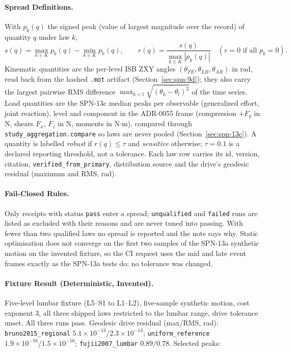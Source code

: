 \paragraph{Spread Definitions.}
With $p_k(q)$ the signed peak (value of largest magnitude over the record) of
quantity $q$ under law $k$,
\begin{equation}
  s(q)=\max_{k\in K}p_k(q)-\min_{k\in K}p_k(q),\qquad
  r(q)=\frac{s(q)}{\max_{k\in K}|p_k(q)|}\quad(r=0\text{ if all }p_k=0).
\end{equation}
Kinematic quantities are the per-level ISB ZXY angles
$(\theta_{FE},\theta_{LB},\theta_{AR})$ in rad, read back from the hashed
\texttt{.mot} artifact (Section~\ref{sec:spn-9d}); they also carry the largest
pairwise RMS difference $\max_{k<l}\sqrt{\overline{(\theta_k-\theta_l)^2}}$ of
the time series. Load quantities are the SPN-13c median peaks per observable
(generalized effort, joint reaction), level and component in the ADR-0055
frame (compression $+F_y$ in N, shears $F_x$, $F_z$ in N, moments in
N$\cdot$m), compared through \texttt{study\_aggregation.compare} so laws are
never pooled (Section~\ref{sec:spn-13c}). A quantity is labelled
\emph{robust} if $r(q)\le\tau$ and \emph{sensitive} otherwise; $\tau=0.1$ is a
declared reporting threshold, not a tolerance. Each law row carries its id,
version, citation, \texttt{verified\_from\_primary}, distribution source and
the drive's geodesic residual (maximum and RMS, rad).

\paragraph{Fail-Closed Rules.}
Only receipts with status \texttt{pass} enter a spread; \texttt{unqualified}
and \texttt{failed} runs are listed as excluded with their reasons and are
never tuned into passing. With fewer than two qualified laws no spread is
reported and the note says why. Static optimisation does not converge on the
first two samples of the SPN-13a synthetic motion on the invented fixture, so
the CI request uses the mid and late event frames exactly as the SPN-13a tests
do; no tolerance was changed.

\paragraph{Fixture Result (Deterministic, Invented).}
Five-level lumbar fixture (L5--S1 to L1--L2), five-sample synthetic motion,
cost exponent 3, all three shipped laws restricted to the lumbar range, drive
tolerance unset. All three runs pass. Geodesic drive residual (max/RMS, rad):
\texttt{bruno2015\_regional} $5.1\times10^{-13}/2.3\times10^{-13}$;
\texttt{uniform\_reference} $1.9\times10^{-16}/1.5\times10^{-16}$;
\texttt{fujii2007\_lumbar} $0.89/0.78$. Selected peaks:


